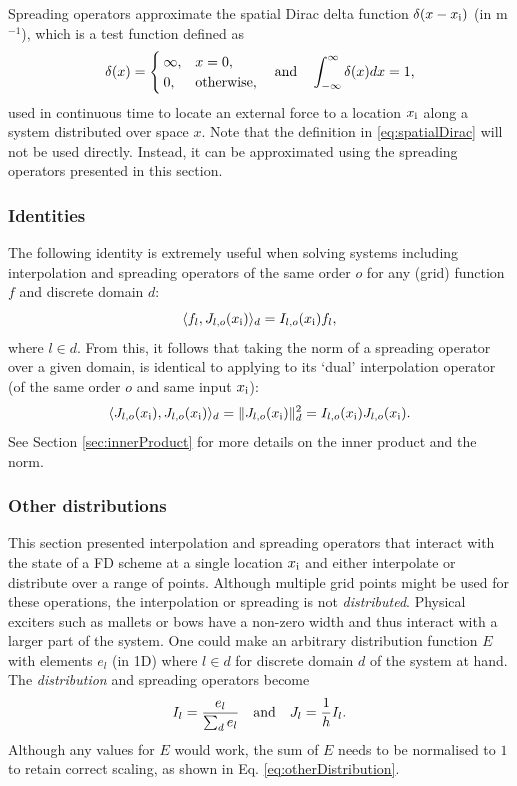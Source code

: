 Spreading operators approximate the spatial Dirac delta function $\delta(x-x_{\text{i}})$ (in m$^{-1}$), which is a test function defined as
\begin{equation}\label{eq:spatialDirac}
    \delta(x)= \begin{cases}
        \infty, & x = 0,\\
        0, & \text{otherwise},
    \end{cases} \quad \text{and} \quad \int_{-\infty}^{\infty} \delta(x)dx = 1,
\end{equation}
used in continuous time to locate an external force to a location $x_{\text{i}}$ along a system distributed over space $x$. Note that the definition in \eqref{eq:spatialDirac} will not be used directly. Instead, it can be approximated using the spreading operators presented in this section. 

\subsubsection{Identities}
The following identity is extremely useful when solving systems including interpolation and spreading operators of the same order $o$ for any (grid) function $f$ and discrete domain $d$:
\begin{equation}\label{eq:identityIJ}
    \langle f_l, J_{l,o}(x_{\text{i}}) \rangle_d = I_{l,o}(x_{\text{i}}) f_l,
\end{equation}
where $l\in d$. From this, it follows that taking the norm of a spreading operator over a given domain, is identical to applying to its `dual' interpolation operator (of the same order $o$ and same input $x_{\text{i}}$):
\begin{equation}\label{eq:JnormIJ}
    \langle  J_{l,o}(x_{\text{i}}), J_{l,o}(x_{\text{i}})\rangle_d = \lVert J_{l,o}(x_{\text{i}})\rVert^2_d = I_{l,o}(x_{\text{i}})J_{l,o}(x_{\text{i}}).
\end{equation}
See Section \ref{sec:innerProduct} for more details on the inner product and the norm.

\subsubsection{Other distributions}
This section presented interpolation and spreading operators that interact with the state of a FD scheme at a single location $x_{\text{i}}$ and either interpolate or distribute over a range of points. Although multiple grid points might be used for these operations, the interpolation or spreading is not \textit{distributed}. Physical exciters such as mallets or bows have a non-zero width and thus interact with a larger part of the system. One could make an arbitrary distribution function $E$ with elements $e_l$ (in 1D) where $l\in d$ for discrete domain $d$ of the system at hand. The \textit{distribution} and spreading operators become
\begin{equation}\label{eq:otherDistribution}
    I_l = \frac{e_l}{\sum_d e_l} \quad \text{and} \quad J_l = \frac{1}{h}I_l.
\end{equation}
Although any values for $E$ would work, the sum of $E$ needs to be normalised to $1$ to retain correct scaling, as shown in Eq. \eqref{eq:otherDistribution}.

